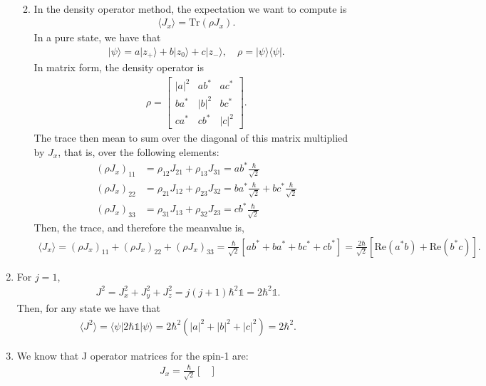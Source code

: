 \documentclass[letterpaper,11pt,twoside]{article}
\newcommand{\ket}[1]{|#1\rangle}
\newcommand{\bra}[1]{\langle#1|}
\newcommand{\braket}[1]{\langle#1\rangle}
\newcommand{\re}[1]{\text{Re}\left(#1\right)}
\begin{document}
\begin{enumerate}[itemsep=0pt,topsep=0pt,label=\alph*)]
\begin{enumerate}[itemsep=0pt,topsep=0pt,label=\roman*)]
\begin{align*}
  \end{align*}
  \item In the density operator method, the expectation we want to compute is 
  \begin{align*}
    \braket{J_x}=\text{Tr}(\rho J_x).
  \end{align*}
  In a pure state, we have that 
  \begin{align*}
    \ket{\psi}=a\ket{z_+}+b\ket{z_0}+c\ket{z_-},\quad\rho=\ket{\psi}\bra{\psi}.
  \end{align*}
  In matrix form, the density operator is 
  \begin{align*}
    \rho=\begin{bmatrix}
      |a|^2&ab^*&ac^*\\
      ba^*&|b|^2&bc^*\\
      ca^*&cb^*&|c|^2
    \end{bmatrix}.
  \end{align*}
  The trace then mean to sum over the diagonal of this matrix multiplied by $J_x$, that is, over the following elements:
  \begin{align*}
    (\rho J_x)_{11}&=\rho_{12}J_{21}+\rho_{13}J_{31}=ab^*\frac{\hbar}{\sqrt{2}}\\
    (\rho J_x)_{22}&=\rho_{21}J_{12}+\rho_{23}J_{32}=ba^*\frac{\hbar}{\sqrt{2}}+bc^*\frac{\hbar}{\sqrt{2}}\\
    (\rho J_x)_{33}&=\rho_{31}J_{13}+\rho_{32}J_{23}=cb^*\frac{\hbar}{\sqrt{2}}
  \end{align*}
  Then, the trace, and therefore the meanvalue is,
  \begin{align*}
    \braket{J_x}=(\rho J_x)_{11}+(\rho J_x)_{22}+(\rho J_x)_{33}=\frac{\hbar}{\sqrt{2}}[ab^*+ba^*+bc^*+cb^*]=\frac{2\hbar}{\sqrt{2}}[\re{a^*b}+\re{b^*c}].
  \end{align*}
\end{enumerate}
  \item For $j=1$, 
  \begin{align*}
    J^2=J_x^2+J_y^2+J_z^2=j(j+1)\hbar^2\mathds{1}=2\hbar^2\mathds{1}.
  \end{align*}
  Then, for any state we have that 
  \begin{align*}
    \braket{J^2}=\braket{\psi|2\hbar\mathds{1}|\psi}=2\hbar^2(|a|^2+|b|^2+|c|^2)=2\hbar^2.
  \end{align*}
  \item We know that J operator matrices for the spin-1 are:
  \begin{align*}
    J_x=\frac{\hbar}{\sqrt{2}}\begin{bmatrix}

\end{bmatrix}
\end{align*}
\end{enumerate}
\end{document}
